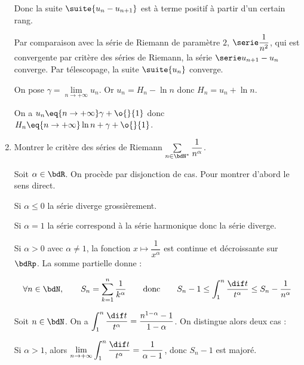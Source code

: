 \documentclass[a4paper,french,bookmarks]{article}
\begin{document}
\begin{enumerate}
{        Donc la suite $\suite{u_n - u_{n+1}}$ est à terme positif à partir d'un certain rang.
        
        Par comparaison avec la série de Riemann de paramètre $2$, \ie $\serie \dfrac{1}{n^2}$, qui est convergente par critère des séries de Riemann, la série $\serie u_{n+1} - u_n$ converge. Par télescopage, la suite $\suite{u_n}$ converge.
        
        On pose $\gamma = \lim\limits_{n \to +\infty} u_n$. Or $u_n = H_n - \ln n$ donc $H_n = u_n + \ln n$. 
        
        On a $u_n \eq{n \to +\infty} \gamma + \o{}{1}$ donc $H_n \eq{n \to +\infty} \ln n + \gamma + \o{}{1}$.
    }
    
    \item Montrer le critère des séries de Riemann $\sum\limits_{n \in \bdN^*} \dfrac{1}{n^\alpha}$.
    
    \noafter
    \yesafter\nobefore
    \begin{nproof}
        Soit $\alpha \in \bdR$. On procède par disjonction de cas. Pour montrer d'abord le sens direct.
        \begin{enumerate}
            \itt Si $\alpha \leq 0$ la série diverge grossièrement.
            
            \itt Si $\alpha=1$ la série correspond à la série harmonique donc la série diverge.
            
            \itt Si $\alpha>0$ avec $\alpha \neq 1$, la fonction $x\mapsto \dfrac{1}{x^\alpha}$ est continue et décroissante sur $\bdRp$. La somme partielle donne :
            
            \[ \forall n \in \bdN,\qquad S_n = \sum_{k=1}^n \dfrac{1}{k^\alpha} \qquad\text{donc}\qquad S_n - 1 \leq \int_1^n \dfrac{\dif t}{t^\alpha} \leq S_n - \dfrac{1}{n^\alpha} \]
            
            Soit $n \in \bdN$. On a $\displaystyle \int_1^n \dfrac{\dif t}{t^\alpha} = \dfrac{n^{1 - \alpha} - 1}{1 - \alpha}$. On distingue alors deux cas :
            
            \begin{enumerate}
                \itstar Si $\alpha > 1$, alors $\lim\limits_{n \to +\infty} \displaystyle \int_1^n \dfrac{\dif t}{t^\alpha} = \dfrac{1}{\alpha - 1}$,  donc $S_n - 1$ est majoré.
                

\end{enumerate}
\end{enumerate}
\end{nproof}
\end{enumerate}
\end{document}
